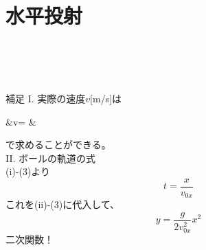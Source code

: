 \documentclass[11pt,twoside]{article}
\begin{document}
\section{水平投射}
	\begin{minipage}[t]{0.34\linewidth}
		\\\\\\
		\begin{itembox}[l]{補足}
			I. 実際の速度$v$[m/s]は
			\begin{flalign*}
			&\qquad v= &
			\end{flalign*}
			で求めることができる。\\
			II. ボールの軌道の式\\
			(i)-(3)より
			\[
				t = \frac{x}{v_{0x}}
			\]
			これを(ii)-(3)に代入して、
			\[
				y = \frac{g}{2v_{0x}^2}x^2
			\]
			\to 二次関数！
		\end{itembox}
	\end{minipage}
	\hfill
\end{document}

